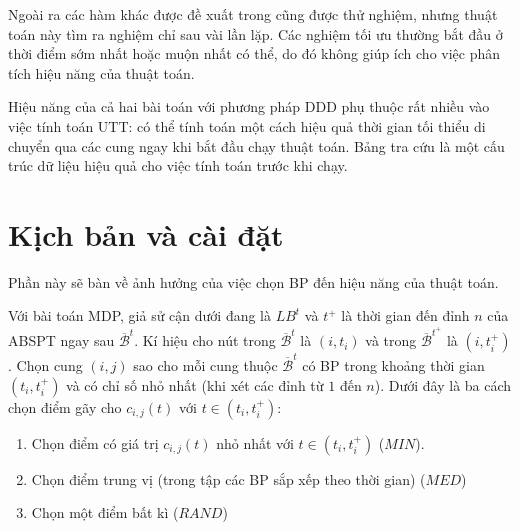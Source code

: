 \documentclass[../main.tex]{subfiles}
\begin{document}

Ngoài ra các hàm khác được đề xuất trong \cite{figliozzi2012time} cũng
được thử nghiệm, nhưng thuật toán này tìm ra nghiệm chỉ sau vài lần lặp.
Các nghiệm tối ưu thường bắt đầu ở thời điểm sớm nhất hoặc muộn nhất có
thể, do đó không giúp ích cho việc phân tích hiệu năng của thuật toán.

Hiệu năng của cả hai bài toán với phương pháp DDD phụ thuộc rất nhiều
vào việc tính toán UTT: có thể tính toán một cách hiệu quả thời gian tối
thiểu di chuyển qua các cung ngay khi bắt đầu chạy thuật toán. Bảng tra
cứu là một cấu trúc dữ liệu hiệu quả cho việc tính toán trước khi chạy.

\section{Kịch bản và cài
đặt}\label{kux1ecbch-bux1ea3n-vuxe0-cuxe0i-ux111ux1eb7t}

Phần này sẽ bàn về ảnh hưởng của việc chọn BP đến hiệu năng của
thuật toán.

Với bài toán MDP, giả sử cận dưới đang là \(LB^t\) và \(t^+\) là thời
gian đến đỉnh \(n\) của ABSPT ngay sau \(\overline{\mathcal{B}}^t\). Kí
hiệu cho nút trong \(\overline{\mathcal{B}}^t\) là \((i,t_i)\) và trong
\(\overline{\mathcal{B}}^{t^+}\) là \((i, t_i^+)\). Chọn cung \((i,j)\)
sao cho mỗi cung thuộc \(\overline{\mathcal{B}}^{t}\) có BP trong
khoảng thời gian \((t_i, t_i^+)\) và có chỉ số nhỏ nhất (khi xét các
đỉnh từ \(1\) đến \(n\)). Dưới đây là ba cách chọn điểm gãy cho
\(c_{i,j}(t)\) với \(t\in (t_i, t_i^+)\):

\begin{enumerate}
\def\labelenumi{\arabic{enumi}.}
\tightlist
\item
  Chọn điểm có giá trị \(c_{i, j}(t)\) nhỏ nhất với
  \(t\in (t_i, t_i^+)\) (\(MIN\)).
\item
  Chọn điểm trung vị (trong tập các BP sắp xếp theo thời gian)
  (\(MED\))
\item
  Chọn một điểm bất kì (\(RAND\))
\end{enumerate}


\end{document}
